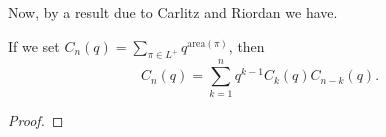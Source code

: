 Now, by a result due to Carlitz and Riordan we have.
\begin{theorem}
    If we set $C_n(q)=\sum_{\pi\in L^+}q^{\text{area}(\pi)}$, then \[
    C_n(q) = \sum_{k=1}^n q^{k-1} C_k(q) C_{n-k}(q).
    \]
\end{theorem}
\begin{proof}
\end{proof}
\endinput
